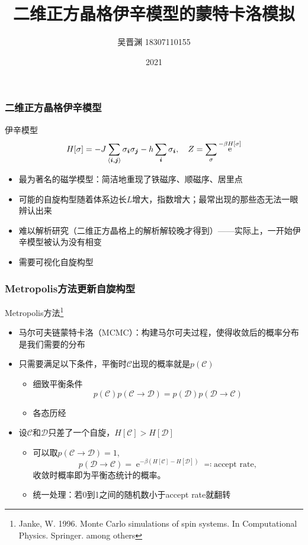 \documentclass[UTF8]{ctexbeamer}
\title{二维正方晶格伊辛模型的蒙特卡洛模拟}
\author{吴晋渊 18307110155}
\institute{复旦大学物理学系}
\date{2021}
\DeclareMathOperator{\ee}{e}
\begin{document}
\frame{\titlepage}

\begin{frame}
\frametitle{二维正方晶格伊辛模型}

伊辛模型
\begin{equation}
    H[\sigma] = - J \sum_{\langle \vb*{i}, \vb*{j} \rangle} \sigma_{\vb*{i}} \sigma_{\vb*{j}} - h \sum_{\vb*{i}} \sigma_{\vb*{i}}, \quad Z = \sum_\sigma \ee^{- \beta H[\sigma]}
\end{equation}    
\begin{itemize}
    \item 最为著名的磁学模型：简洁地重现了铁磁序、顺磁序、居里点
    \item 可能的自旋构型随着体系边长$L$增大，指数增大；最常出现的那些态无法一眼辨认出来
    \item 难以解析研究（二维正方晶格上的解析解较晚才得到）——实际上，一开始伊辛模型被认为没有相变
    \item 需要可视化自旋构型
\end{itemize}

\end{frame}

\begin{frame}
\frametitle{Metropolis方法更新自旋构型}

Metropolis方法\footnote{Janke, W. 1996. Monte Carlo simulations of spin systems. In Computational Physics. Springer. among others}
\begin{itemize}
    \item 马尔可夫链蒙特卡洛（MCMC）：构建马尔可夫过程，使得收敛后的概率分布是我们需要的分布
    \item 只需要满足以下条件，平衡时$\mathcal{C}$出现的概率就是$p(\mathcal{C})$
    \begin{itemize}
        \item 细致平衡条件
        \begin{equation}
            p(\mathcal{C}) p(\mathcal{C} \to \mathcal{D}) = p(\mathcal{D}) p(\mathcal{D} \to \mathcal{C})
        \end{equation} 
        \item 各态历经
    \end{itemize}
    \item 设$\mathcal{C}$和$\mathcal{D}$只差了一个自旋，$H[\mathcal{C}] > H[\mathcal{D}]$
    \begin{itemize}
        \item 可以取$p(\mathcal{C} \to \mathcal{D}) = 1$, 
        \begin{equation}
            p(\mathcal{D} \to \mathcal{C}) = \ee^{- \beta (H[\mathcal{C}] - H[\mathcal{D}])} \eqcolon \text{accept rate},
        \end{equation}
        收敛时概率即为平衡态统计的概率。
        \item 统一处理：若0到1之间的随机数小于accept rate就翻转
    \end{itemize} 
\end{itemize}
\end{frame}
\end{document}
